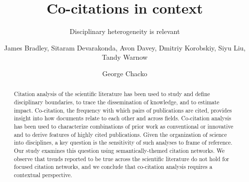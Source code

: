 \documentclass[NETN]{stjour}
\begin{document}
\title[Co-citations in context]{Co-citations in context}
\subtitle{Disciplinary heterogeneity is relevant}



\author[Author Names]
{James Bradley,
Sitaram Devarakonda, Avon Davey, Dmitriy Korobskiy, Siyu Liu, Tandy Warnow
\and George Chacko}










\begin{abstract}
Citation analysis of the scientific literature has been used to study and define disciplinary boundaries, to trace the dissemination of knowledge, and to estimate impact. Co-citation, the frequency with which pairs of publications are cited, provides insight into how documents relate to each other and across fields. Co-citation analysis has been used to characterize combinations of prior work as conventional or innovative and to derive features of highly cited publications. Given the organization of science into disciplines, a key question is the sensitivity of such analyses to frame of reference. Our study examines this question using  semantically-themed citation networks. We observe that trends reported to be true across the scientific literature do not hold for focused citation networks, and we conclude that co-citation analysis requires a contextual perspective.
\end{abstract}
\end{document}
